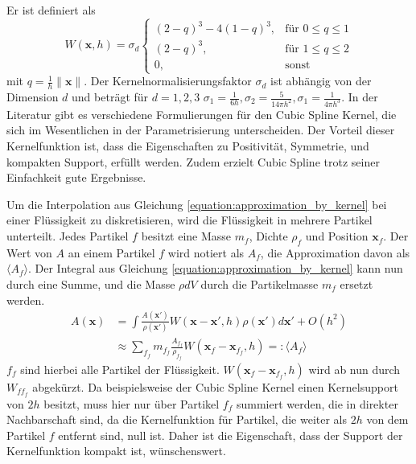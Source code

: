 \documentclass[11pt,
a4paper,
parskip=half, %
BCOR=10mm, %
english,
ngerman]{scrreprt}
\begin{document}
Er ist definiert als
\begin{equation}
    W(\textbf{x}, h) = \sigma_d \begin{cases}
        (2-q)^3 - 4(1-q)^3, &\text{für } 0 \leq q \leq 1\\
        (2-q)^3, &\text{für } 1 \leq q \leq 2\\
        0, &\text{sonst}
    \end{cases}
\end{equation}
mit $q = \frac{1}{h}\|\textbf{x}\|$. Der Kernelnormalisierungsfaktor $\sigma_d$ ist abhängig von der Dimension $d$
und beträgt für $d = 1,2,3$ $\sigma_1 = \frac{1}{6h}, \sigma_2 = \frac{5}{14\pi h^2}, \sigma_1 = \frac{1}{4\pi h^3}$.
In der Literatur gibt es verschiedene Formulierungen für den Cubic Spline Kernel, die sich im Wesentlichen in der Parametrisierung unterscheiden.
Der Vorteil dieser Kernelfunktion ist, dass die Eigenschaften zu Positivität, Symmetrie, und kompakten Support, erfüllt werden.
Zudem erzielt Cubic Spline trotz seiner Einfachkeit gute Ergebnisse.

Um die Interpolation aus Gleichung \ref{equation:approximation_by_kernel} bei einer Flüssigkeit zu diskretisieren,
wird die Flüssigkeit in mehrere Partikel unterteilt. Jedes Partikel $f$ besitzt eine Masse $m_f$, Dichte $\rho_f$ und Position $\textbf{x}_f$.
Der Wert von $A$ an einem Partikel $f$ wird notiert als $A_f$, die Approximation davon als $\langle A_f \rangle$.
Der Integral aus Gleichung \ref{equation:approximation_by_kernel} kann nun durch eine Summe, und die Masse $\rho dV$ durch die Partikelmasse $m_f$ ersetzt werden.
\begin{align}
    A(\textbf{x}) &= \int \frac{A(\textbf{x}')}{\rho(\textbf{x}')} W(\textbf{x} - \textbf{x}', h) \rho(\textbf{x}')d\textbf{x}' + O(h^2)\\
                  &\approx \sum_{f_f} m_{f_f} \frac{A_{f_f}}{\rho_{f_f}} W(\textbf{x}_f - \textbf{x}_{f_f}, h) =: \langle A_f \rangle
\end{align}
$f_f$ sind hierbei alle Partikel der Flüssigkeit.
$W(\textbf{x}_f - \textbf{x}_{f_f}, h)$ wird ab nun durch $W_{ff_f}$ abgekürzt.
Da beispielsweise der Cubic Spline Kernel einen Kernelsupport von $2h$ besitzt, muss hier nur über Partikel $f_f$ summiert werden, die in direkter Nachbarschaft sind,
da die Kernelfunktion für Partikel, die weiter als $2h$ von dem Partikel $f$ entfernt sind, null ist.
Daher ist die Eigenschaft, dass der Support der Kernelfunktion kompakt ist, wünschenswert.
\end{document}
